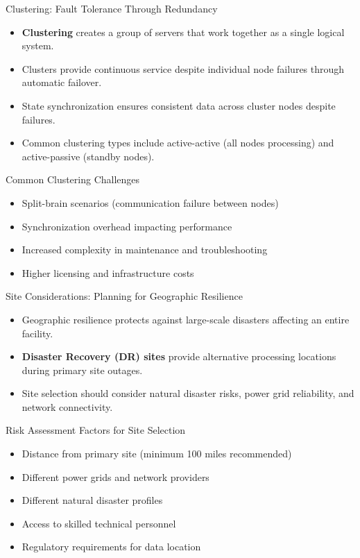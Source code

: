\documentclass{beamer}
\begin{document}
\begin{frame}{Clustering: Fault Tolerance Through Redundancy}
    \begin{itemize}
        \item \textbf{Clustering} creates a group of servers that work together as a single logical system.
        \item Clusters provide continuous service despite individual node failures through automatic failover.
        \item State synchronization ensures consistent data across cluster nodes despite failures.
        \item Common clustering types include active-active (all nodes processing) and active-passive (standby nodes).
    \end{itemize}
    
    \begin{alertblock}{Common Clustering Challenges}
        \begin{itemize}
            \item Split-brain scenarios (communication failure between nodes)
            \item Synchronization overhead impacting performance
            \item Increased complexity in maintenance and troubleshooting
            \item Higher licensing and infrastructure costs
        \end{itemize}
    \end{alertblock}
\end{frame}

\begin{frame}{Site Considerations: Planning for Geographic Resilience}
    \begin{itemize}
        \item Geographic resilience protects against large-scale disasters affecting an entire facility.
        \item \textbf{Disaster Recovery (DR) sites} provide alternative processing locations during primary site outages.
        \item Site selection should consider natural disaster risks, power grid reliability, and network connectivity.
    \end{itemize}
    
    \begin{block}{Risk Assessment Factors for Site Selection}
        \small
        \begin{itemize}
            \item Distance from primary site (minimum 100 miles recommended)
            \item Different power grids and network providers
            \item Different natural disaster profiles
            \item Access to skilled technical personnel
            \item Regulatory requirements for data location
        \end{itemize}
    \end{block}
\end{frame}
\end{document}
